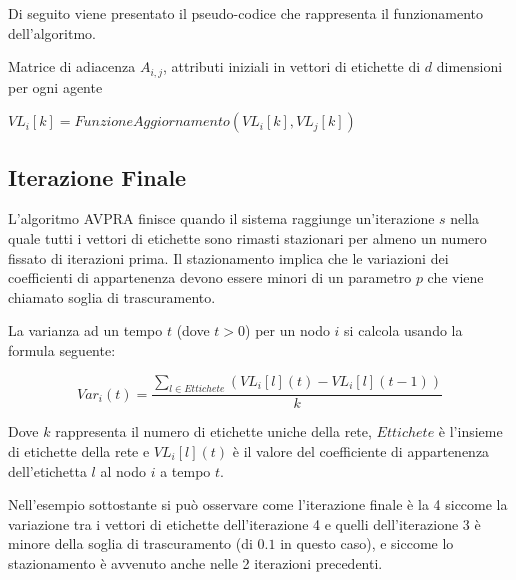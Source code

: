 \documentclass[a4paper,12pt]{report}
\begin{document}
		Di seguito viene presentato il pseudo-codice che rappresenta il funzionamento dell'algoritmo. \cite{avpra}
 
		\begin{algorithmic}
			\REQUIRE Matrice di adiacenza $A_{i, j}$, attributi iniziali in vettori di etichette di $d$ dimensioni per ogni agente


				\STATE {}

					
					\STATE {}


						\STATE {}

							\STATE $VL_i[k] = FunzioneAggiornamento(VL_i[k], VL_j[k])$

						\ENDIF
					\ENDFOR
				\ENDFOR	
			\ENDFOR
		\end{algorithmic}

		\subsection{Iterazione Finale}
		L'algoritmo AVPRA finisce quando il sistema raggiunge un'iterazione $s$ nella quale tutti i vettori di etichette sono rimasti stazionari per almeno un numero fissato di iterazioni prima. Il stazionamento implica che le variazioni dei coefficienti di appartenenza devono essere minori di un parametro $p$ che viene chiamato soglia di trascuramento.  \cite{avpra}

		\pagebreak
	
		La varianza ad un tempo $t$ (dove $t > 0$) per un nodo $i$ si calcola usando la formula seguente:
		
		\begin{equation}
			Var_i(t) = \frac{\sum_{l \in Ettichete} (VL_i[l](t) - VL_i[l](t-1))}{k}
		\end{equation}

		Dove $k$ rappresenta il numero di etichette uniche della rete, $Ettichete$ è l'insieme di etichette della rete e $VL_i[l](t)$ è il valore del coefficiente di appartenenza dell'etichetta $l$ al nodo $i$ a tempo $t$.

		Nell'esempio sottostante si può osservare come l'iterazione finale è la 4 siccome la variazione tra i vettori di etichette dell'iterazione 4 e quelli dell'iterazione 3 è minore della soglia di trascuramento (di $0.1$ in questo caso), e siccome lo stazionamento è avvenuto anche nelle 2 iterazioni precedenti.
		
\end{document}
